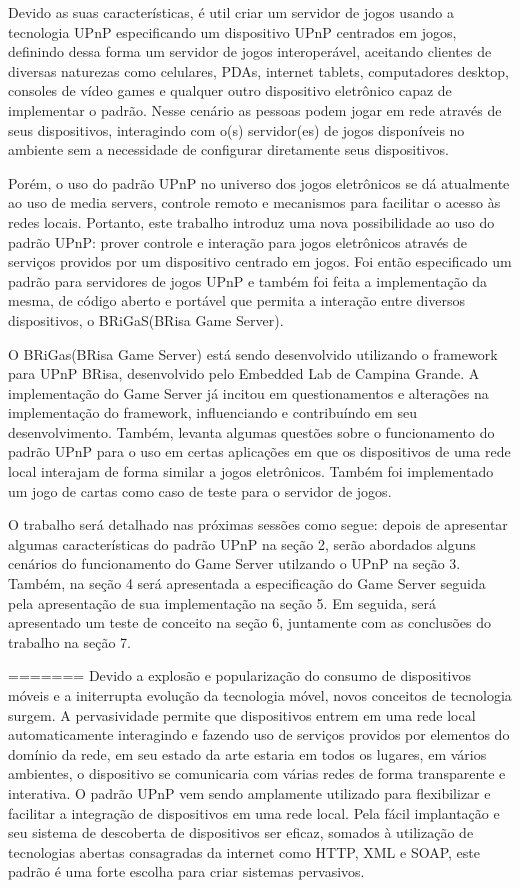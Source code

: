 \documentclass[a4paper]{sbgames}               %
\begin{document}
Devido as suas características, é util criar um servidor de jogos usando a tecnologia UPnP especificando um dispositivo UPnP centrados em jogos, definindo dessa forma um servidor de jogos interoperável, aceitando clientes de diversas naturezas como celulares, PDAs, internet tablets, computadores desktop, consoles de vídeo games e qualquer outro dispositivo eletrônico capaz de implementar o padrão. Nesse cenário as pessoas podem jogar em rede através de seus dispositivos, interagindo com o(s) servidor(es) de jogos disponíveis no ambiente sem a necessidade de configurar diretamente seus dispositivos.

Porém, o uso do padrão UPnP no universo dos jogos eletrônicos se dá atualmente ao uso de media servers, controle remoto e mecanismos para facilitar o acesso às redes locais.  Portanto, este trabalho introduz uma nova possibilidade ao uso do padrão UPnP: prover controle e interação para jogos eletrônicos através de serviços providos por um dispositivo centrado em jogos. Foi então especificado um padrão para servidores de jogos UPnP e também foi feita a implementação da mesma, de código aberto e portável que permita a interação entre diversos dispositivos, o BRiGaS(BRisa Game Server).

O BRiGas(BRisa Game Server) está sendo desenvolvido utilizando o framework para UPnP BRisa, desenvolvido pelo Embedded Lab de Campina Grande. A implementação do Game Server já incitou em questionamentos e alterações na implementação do framework, influenciando e contribuíndo em seu desenvolvimento. Também, levanta algumas questões sobre o funcionamento do padrão UPnP para o uso em certas aplicações em que os dispositivos de uma rede local interajam de forma similar a jogos eletrônicos. Também foi implementado um jogo de cartas como caso de teste para o servidor de jogos.

O trabalho será detalhado nas próximas sessões como segue: depois de apresentar algumas características do padrão UPnP na seção 2, serão abordados alguns cenários do funcionamento do Game Server utilzando o UPnP na seção 3. Também, na seção 4 será apresentada a especificação do Game Server seguida pela apresentação de sua implementação na seção 5. Em seguida, será apresentado um teste de conceito na seção 6, juntamente com as conclusões do trabalho na seção 7.

=======
Devido a explosão e popularização do consumo de dispositivos móveis e a initerrupta evolução da tecnologia móvel, novos conceitos de tecnologia surgem. A pervasividade permite que dispositivos entrem em uma rede local automaticamente interagindo e fazendo uso de serviços providos por elementos do domínio da rede, em seu estado da arte estaria em todos os lugares, em vários ambientes, o dispositivo se comunicaria com várias redes de forma transparente e interativa. O padrão UPnP vem sendo amplamente utilizado para flexibilizar e facilitar a integração de dispositivos em uma rede local. Pela fácil implantação e seu sistema de descoberta de dispositivos ser eficaz, somados à utilização de tecnologias abertas consagradas da internet como HTTP, XML e SOAP, este padrão é uma forte escolha para criar sistemas pervasivos.
\end{document}
